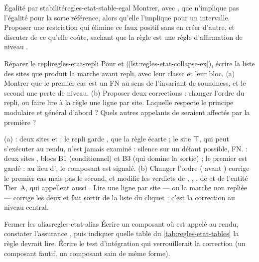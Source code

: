 \begin{exercice}{Égalité par stabilité}{regles-etat-stable-egal}
Montrer, avec , que  n'implique pas l'égalité pour la sorte référence, alors qu'elle l'implique pour un intervalle. Proposer une restriction qui élimine ce faux positif sans en créer d'autre, et discuter de ce qu'elle coûte, sachant que la règle est une règle d'affirmation de niveau \Warning.
\end{exercice}

\begin{exercice}{Réparer le repli}{regles-etat-repli}
Pour  et  (\cref{lst:regles-etat-collapse-ex}), écrire la liste des sites que produit la marche avant repli, avec leur classe et leur bloc. (a) Montrer que le premier cas est un FN au sens de l'invariant de soundness, et le second une perte de niveau. (b) Proposer deux corrections : changer l'ordre du repli, ou faire lire à la règle une ligne par site. Laquelle respecte le principe \og modulaire et général d'abord\fg{} ? Quels autres appelants de  seraient affectés par la première ?
\end{exercice}

\begin{solution}
(a)  : deux sites  et  ; le repli garde , que la règle écarte ; le site ⊤, qui peut s'exécuter au rendu, n'est jamais examiné : silence sur un défaut possible, FN.  : deux sites , blocs B1 (conditionnel) et B3 (qui domine la sortie) ; le premier est gardé : \Warning{} au lieu d'\Error, le composant est signalé. (b) Changer l'ordre ( avant ) corrige le premier cas mais pas le second, et modifie les verdicts de , , , de  et de l'entité Tier~A, qui appellent aussi . Lire une ligne par site ---  ou la marche non repliée --- corrige les deux et fait sortir  de la liste du cliquet : c'est la correction au niveau central.
\end{solution}

\begin{exercice}{Fermer les alias}{regles-etat-alias}
Écrire un composant où  est appelé au rendu, constater l'assurance , puis indiquer quelle table du \cref{tab:regles-etat-tables} la règle devrait lire. Écrire le test d'intégration qui verrouillerait la correction (un composant fautif, un composant sain de même forme).
\end{exercice}

